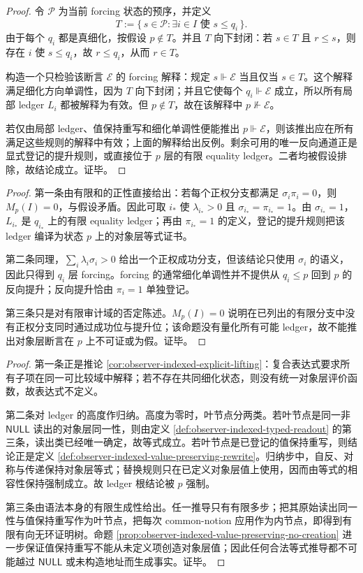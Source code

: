 \begin{proof}
令 \(\mathcal P\) 为当前 forcing 状态的预序，并定义
\[
T:=\{\,s\in\mathcal P:\exists i\in I\text{ 使 }s\le q_i\,\}.
\]
由于每个 \(q_i\) 都是真细化，按假设 \(p\notin T\)。并且 \(T\) 向下封闭：若 \(s\in T\) 且 \(r\le s\)，则存在 \(i\) 使 \(s\le q_i\)，故 \(r\le q_i\)，从而 \(r\in T\)。

构造一个只检验该断言 \(\mathcal E\) 的 forcing 解释：规定 \(s\Vdash \mathcal E\) 当且仅当 \(s\in T\)。这个解释满足细化方向单调性，因为 \(T\) 向下封闭；并且它使每个 \(q_i\Vdash\mathcal E\) 成立，所以所有局部 ledger \(L_i\) 都被解释为有效。但 \(p\notin T\)，故在该解释中 \(p\nVdash\mathcal E\)。

若仅由局部 ledger、值保持重写和细化单调性便能推出 \(p\Vdash\mathcal E\)，则该推出应在所有满足这些规则的解释中有效；上面的解释给出反例。剩余可用的唯一反向通道正是显式登记的提升规则，或直接位于 \(p\) 层的有限 equality ledger。二者均被假设排除，故结论成立。证毕。
\end{proof}

\begin{proof}
第一条由有限和的正性直接给出：若每个正权分支都满足 \(\sigma_i\pi_i=0\)，则 \(M_p(I)=0\)，与假设矛盾。因此可取 \(i_\ast\) 使 \(\lambda_{i_\ast}>0\) 且 \(\sigma_{i_\ast}=\pi_{i_\ast}=1\)。由 \(\sigma_{i_\ast}=1\)，\(L_{i_\ast}\) 是 \(q_{i_\ast}\) 上的有限 equality ledger；再由 \(\pi_{i_\ast}=1\) 的定义，登记的提升规则把该 ledger 编译为状态 \(p\) 上的对象层等式证书。

第二条同理，\(\sum_i\lambda_i\sigma_i>0\) 给出一个正权成功分支，但该结论只使用 \(\sigma_i\) 的语义，因此只得到 \(q_i\) 层 forcing。forcing 的通常细化单调性并不提供从 \(q_i\le p\) 回到 \(p\) 的反向提升；反向提升恰由 \(\pi_i=1\) 单独登记。

第三条只是对有限审计域的否定陈述。\(M_p(I)=0\) 说明在已列出的有限分支中没有正权分支同时通过成功位与提升位；该命题没有量化所有可能 ledger，故不能推出对象层断言在 \(p\) 上不可证或为假。证毕。
\end{proof}

\begin{proof}
第一条正是推论 \ref{cor:observer-indexed-explicit-lifting}：复合表达式要求所有子项在同一可比较域中解释；若不存在共同细化状态，则没有统一对象层评价函数，故表达式不定义。

第二条对 ledger 的高度作归纳。高度为零时，叶节点分两类。若叶节点是同一非 \(\mathsf{NULL}\) 读出的对象层同一性，则由定义 \ref{def:observer-indexed-typed-readout} 的第三条，读出类已经唯一确定，故等式成立。若叶节点是已登记的值保持重写，则结论正是定义 \ref{def:observer-indexed-value-preserving-rewrite}。归纳步中，自反、对称与传递保持对象层等式；替换规则只在已定义对象层值上使用，因而由等式的相容性保持强制成立。故 ledger 根结论被 \(p\) 强制。

第三条由语法本身的有限生成性给出。任一推导只有有限多步；把其原始读出同一性与值保持重写作为叶节点，把每次 common-notion 应用作为内节点，即得到有限有向无环证明树。命题 \ref{prop:observer-indexed-value-preserving-no-creation} 进一步保证值保持重写不能从未定义项创造对象层值；因此任何合法等式推导都不可能越过 \(\mathsf{NULL}\) 或未构造地址而生成事实。证毕。
\end{proof}


